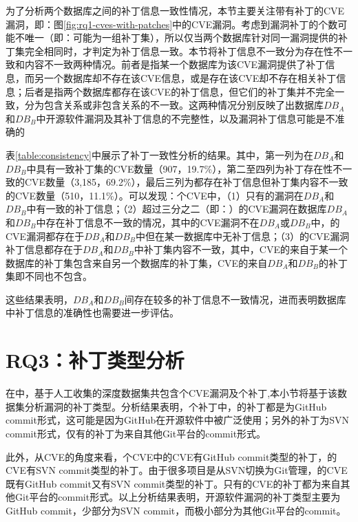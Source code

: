 为了分析两个数据库之间的补丁信息一致性情况，本节主要关注带有补丁的CVE漏洞，即：图\ref{fig:rq1-cves-with-patches}中的CVE漏洞。考虑到漏洞补丁的个数可能不唯一（即：可能为一组补丁集），所以仅当两个数据库针对同一漏洞提供的补丁集完全相同时，才判定为补丁信息一致。本节将补丁信息不一致分为存在性不一致和内容不一致两种情况。前者是指某一个数据库为该CVE漏洞提供了补丁信息，而另一个数据库却不存在该CVE信息，或是存在该CVE却不存在相关补丁信息；后者是指两个数据库都存在该CVE的补丁信息，但它们的补丁集并不完全一致，分为包含关系或非包含关系的不一致。这两种情况分别反映了出数据库$DB_A$和$DB_B$中开源软件漏洞及其补丁信息的不完整性，以及漏洞补丁信息可能是不准确的


表\ref{table:consistency}中展示了补丁一致性分析的结果。其中，第一列为在$DB_A$和$DB_B$中具有一致补丁集的CVE数量（907，19.7\%），第二至四列为补丁存在性不一致的CVE数量（3,185，69.2\%），最后三列为都存在补丁信息但补丁集内容不一致的CVE数量（510，11.1\%）。可以发现：个CVE中，（1）只有的漏洞在$DB_A$和$DB_B$中有一致的补丁信息；（2）超过三分之二（即：）的CVE漏洞在数据库$DB_A$和$DB_B$中存在补丁信息不一致的情况，其中的CVE漏洞不在$DB_{A}$或$DB_{B}$中，的CVE漏洞都存在于$DB_{A}$和$DB_{B}$中但在某一数据库中无补丁信息；（3）的CVE漏洞补丁信息都存在于$DB_{A}$和$DB_{B}$中补丁集内容不一致，其中，CVE的来自于某一个数据库的补丁集包含来自另一个数据库的补丁集，CVE的来自$DB_{A}$和$DB_{B}$的补丁集即不同也不包含。

这些结果表明，$DB_A$和$DB_B$间存在较多的补丁信息不一致情况，进而表明数据库中补丁信息的准确性也需要进一步评估。


\section{RQ3：补丁类型分析}\label{sec:type}

在中，基于人工收集的深度数据集共包含个CVE漏洞及个补丁,本小节将基于该数据集分析漏洞的补丁类型。分析结果表明，个补丁中，的补丁都是为GitHub commit形式，这可能是因为GitHub在开源软件中被广泛使用；另外的补丁为SVN commit形式，仅有的补丁为来自其他Git平台的commit形式。

此外，从CVE的角度来看，个CVE中的CVE有GitHub commit类型的补丁，的CVE有SVN commit类型的补丁。由于很多项目是从SVN切换为Git管理，的CVE既有GitHub commit又有SVN commit类型的补丁。只有的CVE的补丁都为来自其他Git平台的commit形式。以上分析结果表明，开源软件漏洞的补丁类型主要为GitHub commit，少部分为SVN commit，而极小部分为其他Git平台的commit。

